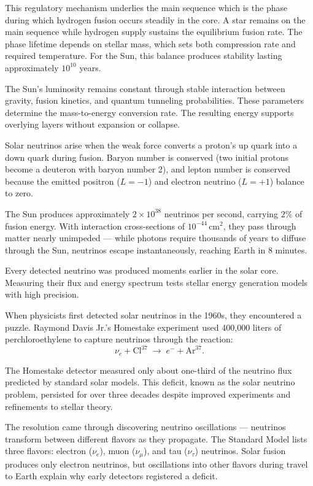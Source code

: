 This regulatory mechanism underlies the main sequence which is the phase during which hydrogen fusion occurs steadily in the core. A star remains on the main sequence while hydrogen supply sustains the equilibrium fusion rate. The phase lifetime depends on stellar mass, which sets both compression rate and required temperature. For the Sun, this balance produces stability lasting approximately $10^{10}$ years.

The Sun's luminosity remains constant through stable interaction between gravity, fusion kinetics, and quantum tunneling probabilities. These parameters determine the mass-to-energy conversion rate. The resulting energy supports overlying layers without expansion or collapse.

Solar neutrinos arise when the weak force converts a proton's up quark into a down quark during fusion. Baryon number is conserved (two initial protons become a deuteron with baryon number 2), and lepton number is conserved because the emitted positron ($L=-1$) and electron neutrino ($L=+1$) balance to zero.

The Sun produces approximately $2 \times 10^{38}$ neutrinos per second, carrying $2\%$ of fusion energy. With interaction cross-sections of $10^{-44}\,\text{cm}^2$, they pass through matter nearly unimpeded — while photons require thousands of years to diffuse through the Sun, neutrinos escape instantaneously, reaching Earth in 8 minutes.

Every detected neutrino was produced moments earlier in the solar core. Measuring their flux and energy spectrum tests stellar energy generation models with high precision.

When physicists first detected solar neutrinos in the 1960s, they encountered a puzzle. Raymond Davis Jr.'s Homestake experiment used 400,000 liters of perchloroethylene to capture neutrinos through the reaction:
\[
\nu_e + \text{Cl}^{37} \;\to\; e^- + \text{Ar}^{37}.
\]

The Homestake detector measured only about one-third of the neutrino flux predicted by standard solar models. This deficit, known as the solar neutrino problem, persisted for over three decades despite improved experiments and refinements to stellar theory.

The resolution came through discovering neutrino oscillations — neutrinos transform between different flavors as they propagate. The Standard Model lists three flavors: electron ($\nu_e$), muon ($\nu_\mu$), and tau ($\nu_\tau$) neutrinos. Solar fusion produces only electron neutrinos, but oscillations into other flavors during travel to Earth explain why early detectors registered a deficit.

